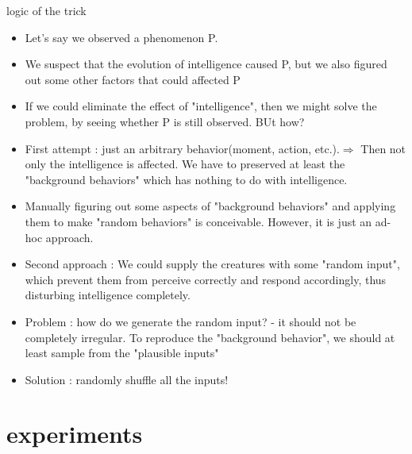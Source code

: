 \documentclass{beamer}
\theoremstyle{definition}
\theoremstyle{remark}
\numberwithin{equation}{section}
\begin{document}
\begin{frame}[allowframebreaks]{logic of the trick}
\begin{itemize}
\item Let's say we observed a phenomenon P.
\item We suspect that the evolution of intelligence caused P, but we also figured out some other factors that could affected P
\item If we could eliminate the effect of "intelligence", then we might solve the problem, by seeing whether P is still observed. BUt how?
\item First attempt : just an arbitrary behavior(moment, action, etc.).$\Rightarrow$ Then not only the intelligence is affected. We have to preserved at least the "background behaviors" which has nothing to do with intelligence.
\framebreak
\item Manually figuring out some aspects of "background behaviors" and applying them to make "random behaviors" is conceivable. However, it is just an ad-hoc approach.
\item Second approach : We could supply the creatures with some "random input", which prevent them from perceive correctly and respond accordingly, thus disturbing intelligence completely. 
\item Problem : how do we generate the random input? - it should not be completely irregular. To reproduce the "background behavior", we should at least sample from the "plausible inputs"
\item Solution : randomly shuffle all the inputs!
\end{itemize} 
\end{frame}

\section{experiments}
\end{document}
